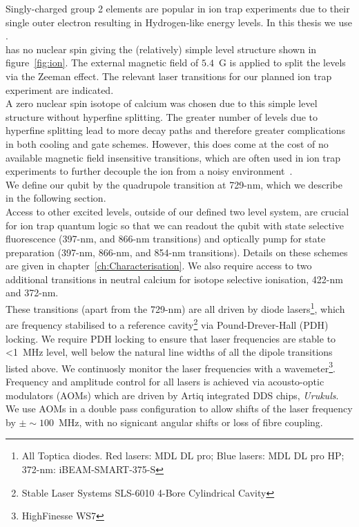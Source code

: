     Singly-charged group 2 elements are popular in ion trap
    experiments due to their single outer electron resulting in Hydrogen-like
    energy levels. In this thesis we use \ca.\\
    \ca has
    no nuclear spin giving the
    (relatively) simple level structure shown in figure~\ref{fig:ion}. The external
    magnetic field of $5.4$~G is applied to split the levels via the Zeeman
    effect. The relevant laser transitions for our planned ion trap
    experiment are indicated.\\
    A zero nuclear spin isotope of calcium was chosen due to this simple level
    structure without hyperfine splitting. The greater number of levels due to
    hyperfine splitting lead to more decay paths and therefore greater
    complications in both cooling and gate schemes. However, this does come at
    the cost of no available magnetic field insensitive transitions, which are
    often used in ion trap experiments to further decouple the ion from a noisy
    environment~\cite{}. \\
    We define our qubit by the quadrupole transition at 729-nm, which we describe in the following section.\\
    Access to other excited levels, outside of our defined two level system, are crucial for ion trap quantum logic so that we can readout the qubit with state selective fluorescence (397-nm, and 866-nm transitions) and optically pump for state preparation (397-nm, 866-nm, and 854-nm transitions). Details on these schemes are given in chapter~\ref{ch:Characterisation}. We also require access to two additional transitions in neutral calcium for isotope selective ionisation, 422-nm and 372-nm.\\
    These transitions (apart from the 729-nm) are all driven by diode lasers\footnote{All Toptica diodes. Red lasers: MDL DL pro; Blue lasers: MDL DL pro HP; 372-nm: iBEAM-SMART-375-S}, which are frequency stabilised to a reference cavity\footnote{Stable Laser Systems SLS-6010 4-Bore Cylindrical Cavity} via Pound-Drever-Hall (PDH) locking. We require PDH locking to ensure that laser frequencies are stable to <1~MHz level, well below the natural line widths of all the dipole transitions listed above. We continuosly monitor the laser frequencies with a wavemeter\footnote{HighFinesse WS7}.\\
    Frequency and amplitude control for all lasers is achieved via acousto-optic modulators (AOMs) which are driven by Artiq integrated DDS chips, \emph{Urukuls}. We use AOMs in a double pass configuration to allow shifts of the laser frequency by $\pm \sim 100$~MHz, with no signicant angular shifts or loss of fibre coupling. 
    
